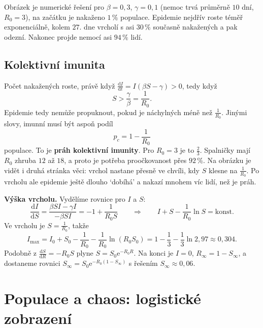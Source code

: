 Obrázek je numerické řešení pro $\beta = 0{,}3$, $\gamma = 0{,}1$ (nemoc trvá průměrně $10$ dní, $R_0 = 3$), na začátku je nakaženo $1\,\%$ populace. Epidemie nejdřív roste téměř exponenciálně, kolem $27$. dne vrcholí s asi $30\,\%$ současně nakažených a pak odezní. Nakonec projde nemocí asi $94\,\%$ lidí.

\subsection{Kolektivní imunita}

Počet nakažených roste, právě když $\frac{\mathrm{d}I}{\mathrm{d}t} = I(\beta S - \gamma) > 0$, tedy když
\begin{equation*}
  S > \frac{\gamma}{\beta} = \frac{1}{R_0}.
\end{equation*}
Epidemie tedy nemůže propuknout, pokud je náchylných méně než $\frac{1}{R_0}$. Jinými slovy, imunní musí být aspoň podíl
\begin{equation*}
  p_c = 1 - \frac{1}{R_0}
\end{equation*}
populace. To je \textbf{práh kolektivní imunity}. Pro $R_0 = 3$ je to $\frac{2}{3}$. Spalničky mají $R_0$ zhruba $12$ až $18$, a proto je potřeba proočkovanost přes $92\,\%$. Na obrázku je vidět i druhá stránka věci: vrchol nastane přesně ve chvíli, kdy $S$ klesne na $\frac{1}{R_0}$. Po vrcholu ale epidemie ještě dlouho `dobíhá' a nakazí mnohem víc lidí, než je práh.

\begin{example}
  \textbf{Výška vrcholu.} Vydělíme rovnice pro $I$ a $S$:
  \begin{equation*}
    \frac{\mathrm{d}I}{\mathrm{d}S} = \frac{\beta SI - \gamma I}{-\beta SI} = -1 + \frac{1}{R_0S}\qquad\Longrightarrow\qquad I + S - \frac{1}{R_0}\ln S = \text{konst.}
  \end{equation*}
  Ve vrcholu je $S = \frac{1}{R_0}$, takže
  \begin{equation*}
    I_{\max} = I_0 + S_0 - \frac{1}{R_0} - \frac{1}{R_0}\ln(R_0S_0) = 1 - \frac{1}{3} - \frac{1}{3}\ln 2{,}97\approx 0{,}304.
  \end{equation*}
  Podobně z $\frac{\mathrm{d}S}{\mathrm{d}R} = -R_0S$ plyne $S = S_0\mathrm{e}^{-R_0R}$. Na konci je $I = 0$, $R_\infty = 1 - S_\infty$, a dostaneme rovnici $S_\infty = S_0\mathrm{e}^{-R_0(1 - S_\infty)}$ s řešením $S_\infty\approx 0{,}06$.
\end{example}

\section{Populace a chaos: logistické zobrazení}

